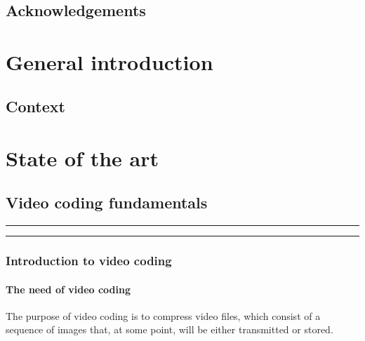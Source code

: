 \documentclass[11pt,a4paper,openright,twoside]{book}
\title{\Huge\bf\mytitle}
\author{\myauthor}
\providecommand{\chaptertoc}{
	\startcontents[chapters]
	\hrule
	\vspace{1em}
	\printcontents[chapters]{}{1}{{\bf\large Contents}}
	\hrule
}
\numberwithin{equation}{section} %
\begin{document}
\frontmatter
\maketitle

\chapter*{Acknowledgements}
\label{cha:acknowledgements}

\setcounter{tocdepth}{5}
\tableofcontents
{}
\cleardoublepage
\listoffigures
\cleardoublepage
\listoftables
\cleardoublepage

\mainmatter
\part{General introduction}
\label{prt:general_introduction}

\chapter*{Context}
\label{cha:context}

\part{State of the art}
\label{prt:state_of_the_art}

\chapter{Video coding fundamentals}
\label{sec:video_coding_fundamentals}
\chaptertoc

\section{Introduction to video coding}
\label{sec:introduction_to_video_coding}

\subsection{The need of video coding}
\label{sub:the_need_of_video_coding}

The purpose of video coding is to compress video files, which consist of
a sequence of images that, at some point, will be either transmitted or
stored.
\end{document}
